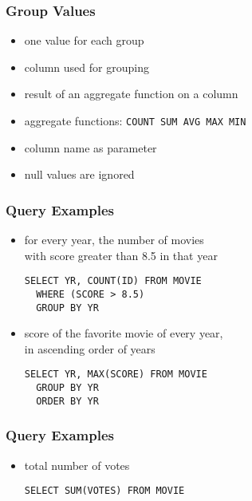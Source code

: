 \documentclass[dvipsnames]{beamer}
\theoremstyle{plain}
\begin{document}
\begin{frame}[fragile]
  \frametitle{Group Values}

  \begin{itemize}
    \item one value for each group
    \item column used for grouping
    \item result of an aggregate function on a column

    \pause
    \medskip
    \item aggregate functions: \lstinline!COUNT SUM AVG MAX MIN!
    \item column name as parameter
    \item null values are ignored
  \end{itemize}
\end{frame}

\begin{frame}[fragile]
  \frametitle{Query Examples}

  \begin{itemize}
    \item for every year, the number of movies\\
      with score greater than 8.5 in that year
    \begin{lstlisting}
SELECT YR, COUNT(ID) FROM MOVIE
  WHERE (SCORE > 8.5)
  GROUP BY YR
    \end{lstlisting}

    \pause
    \item score of the favorite movie of every year,\\
      in ascending order of years
    \begin{lstlisting}
SELECT YR, MAX(SCORE) FROM MOVIE
  GROUP BY YR
  ORDER BY YR
    \end{lstlisting}
  \end{itemize}
\end{frame}

\begin{frame}[fragile]
  \frametitle{Query Examples}

  \begin{itemize}
    \item total number of votes
    \begin{lstlisting}
SELECT SUM(VOTES) FROM MOVIE
    \end{lstlisting}
  \end{itemize}
\end{frame}
\end{document}
